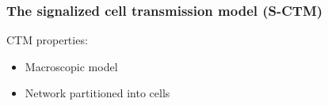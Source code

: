 \begin{frame}
    \frametitle{The signalized cell transmission model (S-CTM)}
    \begin{minipage}[c]{0.4\textwidth}
    CTM properties:
    \begin{itemize}
    \item Macroscopic model
    \item Network partitioned into cells
    \end{itemize}
    \end{minipage}
    ~
    \begin{minipage}[c]{0.4\textwidth}
    \end{minipage}
\end{frame}